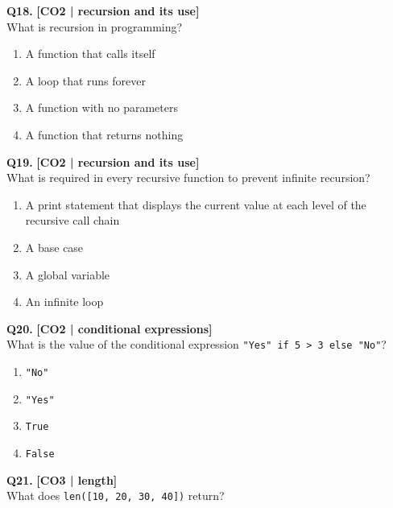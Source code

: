 \noindent\textbf{Q18.} \hfill {\small\color{LPUOrange}\textbf{[CO2 | recursion and its use]}}\\[2pt]
What is recursion in programming?

\begin{enumerate}[label=(\alph*),topsep=2pt,itemsep=1pt,partopsep=0pt,parsep=0pt]
    \item \relax A function that calls itself
    \item \relax A loop that runs forever
    \item \relax A function with no parameters
    \item \relax A function that returns nothing
\end{enumerate}
\vspace{{2mm}}

\noindent\textbf{Q19.} \hfill {\small\color{LPUOrange}\textbf{[CO2 | recursion and its use]}}\\[2pt]
What is required in every recursive function to prevent infinite recursion?

\begin{enumerate}[label=(\alph*),topsep=2pt,itemsep=1pt,partopsep=0pt,parsep=0pt]
    \item \relax A print statement that displays the current value at each level of the recursive call chain
    \item \relax A base case
    \item \relax A global variable
    \item \relax An infinite loop
\end{enumerate}
\vspace{{2mm}}

\noindent\textbf{Q20.} \hfill {\small\color{LPUOrange}\textbf{[CO2 | conditional expressions]}}\\[2pt]
What is the value of the conditional expression \texttt{"Yes" if 5 > 3 else "No"}?

\begin{enumerate}[label=(\alph*),topsep=2pt,itemsep=1pt,partopsep=0pt,parsep=0pt]
    \item \relax \texttt{"No"}
    \item \relax \texttt{"Yes"}
    \item \relax \texttt{True}
    \item \relax \texttt{False}
\end{enumerate}
\vspace{{2mm}}

\noindent\textbf{Q21.} \hfill {\small\color{LPUOrange}\textbf{[CO3 | length]}}\\[2pt]
What does \texttt{len([10, 20, 30, 40])} return?

